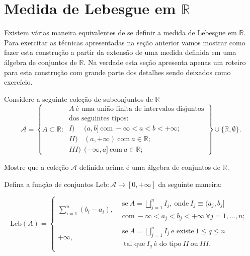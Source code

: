 \section{Medida de Lebesgue em $\mathbb{R}$}


Existem várias maneira equivalentes de se definir a medida 
de Lebesgue em $\mathbb{R}$.
Para exercitar as técnicas apresentadas na seção anterior
vamos mostrar como fazer esta construção a partir da extensão 
de uma medida definida em uma álgebra de conjuntos de $\mathbb{R}$.
Na verdade esta seção apresenta apenas um roteiro para 
esta construção com grande parte dos detalhes sendo deixados 
como exercício.

Considere a seguinte coleção de subconjuntos de $\mathbb{R}$
\begin{equation}\label{algebra-conjuntos-R}
\mathcal{A}
=
\left\{ 
A\subset \mathbb{R}:\ 
\begin{array}{l}
A\
\text{é uma união finita de intervalos disjuntos}
\\
\text{dos seguintes tipos:}
\\
I)\phantom{II} \ \ (a,b]
\ \text{com}\ -\infty< a<b< +\infty;
\\
II)\phantom{I} \ \ (a,+\infty) \ \text{com}\  a\in\mathbb{R};
\\
III) \ \ (-\infty,a]  \ \text{com}\  a\in\mathbb{R};
\end{array}
\right\}
\cup
\{\mathbb{R},\emptyset\}.
\end{equation}



\begin{exercicio}
	Mostre que a coleção $\mathcal{A}$ definida acima é uma 
	álgebra de conjuntos de $\mathbb{R}$.
\end{exercicio}

Defina a função de conjuntos $\textrm{Leb}:\mathcal{A}\to[0,+\infty]$ 
da seguinte maneira:

\[
\textrm{Leb}(A)
=
\begin{cases}
\displaystyle
\sum_{i=1}^n (b_i-a_i),
	&
	\begin{array}{l}
	\text{se} \ A=\bigsqcup_{j=1}^n I_j, \ 
	\text{onde}\  I_j\equiv (a_j,b_j]
	\\
	\text{com}\ -\infty< a_j<b_j< +\infty \ \forall j=1,\ldots,n;
	\end{array}
\\[0.8cm]
+\infty,
	& 
\begin{array}{l}
	\text{se} \ A=\bigsqcup_{j=1}^n I_j\ \text{e existe} \ 1\leq q\leq n 
	\\
	\ \text{tal que}\ I_q\ \text{é do tipo} \ II\ \text{ou}\ III.
\end{array}
\end{cases}
\]



